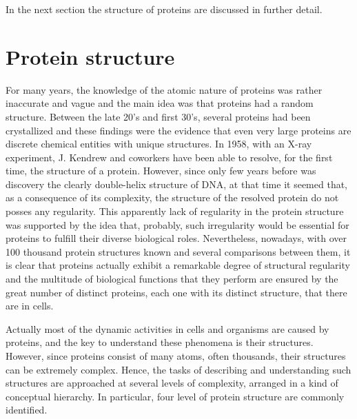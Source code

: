 


In the next section the structure of proteins are discussed in further detail.

\section{Protein structure}\label{sec:prot-structure}
For many years, the knowledge of the atomic nature of proteins was rather inaccurate and vague and the main idea was that proteins had a random structure. Between the late 20's and first 30's, several proteins had been crystallized and these findings were the evidence that even very large proteins are discrete chemical entities with unique structures. 
In 1958, with an X-ray experiment, J. Kendrew and coworkers have been able to resolve, for the first time, the structure of a protein. However, since only few years before was discovery the clearly double-helix structure of DNA, at that time it seemed that, as a consequence of its complexity, the structure of the resolved protein do not posses any regularity. This apparently lack of regularity in the protein structure was supported by the idea that, probably, such irregularity would be essential for proteins to fulfill their diverse biological roles. Nevertheless, nowadays, with over 100 thousand protein structures known and several comparisons between them, it is clear that proteins actually exhibit a remarkable degree of structural regularity and the multitude of biological functions that they perform are ensured by the great number of distinct proteins, each one with its distinct structure, that there are in cells.

Actually most of the dynamic activities in cells and organisms are caused by proteins, and the key to understand these phenomena is their structures. However, since proteins consist of many atoms, often thousands, their structures can be extremely complex. Hence, the tasks of describing and understanding such structures are approached at several levels of complexity, arranged in a kind of conceptual hierarchy. In particular, four level of protein structure are commonly identified. 

